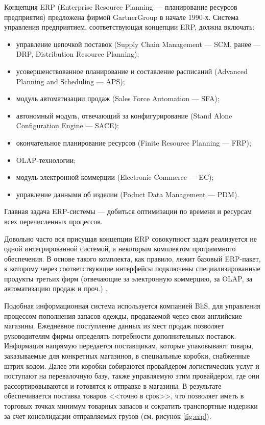 Концепция ERP (Enterprise Resource Planning --- планирование ресурсов предприятия) предложена фирмой GartnerGroup в начале 1990-х.
Система управления предприятием, соответствующая концепции ERP, должна включать:
\begin{itemize}
	\item управление цепочкой поставок (Supply Chain Management --- SCM, ранее --- DRP, Distribution Resource Planning);
	\item усовершенствованное планирование и составление расписаний (Advanced Planning and Scheduling --- APS);
	\item модуль автоматизации продаж (Sales Force Automation --- SFA);
	\item автономный модуль, отвечающий за конфигурирование (Stand Alone Configuration Engine --- SACE);
	\item окончательное планирование ресурсов (Finite Resource Planning --- FRP);
	\item OLAP-технологии;
	\item модуль электронной коммерции (Electronic Commerce --- EC);
	\item управление данными об изделии (Poduct Data Management --- PDM).
\end{itemize}

Главная задача ERP-системы --- добиться оптимизации по времени и ресурсам всех перечисленных процессов.

Довольно часто вся присущая концепции ERP совокупност задач реализуется не одной интегрированной системой, а некоторым комплектом программного обеспечения.
В основе такого комплекта, как правило, лежит базовый ERP-пакет, к которому через соответствующие интерфейсы подключены специализированные продукты третьих фирм (отвечающие за электронную коммерцию, за OLAP, за автоматизацию продаж и проч.) \cite[с. 489]{grigoryev}.


Подобная информационная система используется компанией BhS, для управления процессом пополнения запасов одежды, продаваемой через свои английские магазины.
Ежедневное поступление данных из мест продаж позволяет руководителям фирмы определять потребности дополнительных поставок.
Информация напрямую передается поставщикам, которые упаковывают товары, заказываемые для конкретных магазинов, в специальные коробки, снабженные штрих-кодом.
Далее эти коробки собираются провайдером логистических услуг и поступают на перевалочную базу, также управляемую этим провайдером, где они рассортировываются и готовятся к отправке в магазины.
В результате обеспечивается поставка товаров <<точно в срок>>, что позволяет иметь в торговых точках минимум товарных запасов и сократить транспортные издержки за счет консолидации отправляемых грузов (см. рисунок \ref{fig:erp}).

